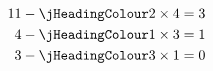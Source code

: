 


\begin{align}
	11 - {\jHeadingColour 2}\times 4 & = 3 
	\\
	4 - {\jHeadingColour 1}\times 3 & = 1\label{eq:411}
	\\
	3 - {\jHeadingColour 3}\times 1 & = 0 
\end{align}

